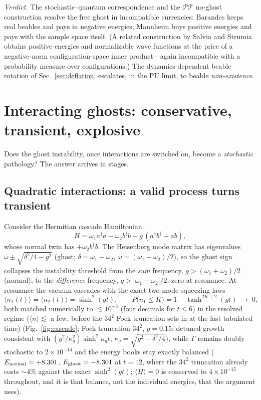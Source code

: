 \documentclass[11pt]{article}
\theoremstyle{definition}
\theoremstyle{remark}
\newcommand{\PT}{\mathcal{PT}}
\newcommand{\Gam}{\Gamma}
\newcommand{\avg}[1]{\langle #1 \rangle}
\begin{document}
\emph{Verdict.} The stochastic--quantum correspondence and the $\PT$
no-ghost construction resolve the free ghost in incompatible currencies:
Barandes keeps real beables and pays in negative energies; Mannheim buys
positive energies and pays with the sample space itself. (A related
construction by Salvio and Strumia \cite{SalvioStrumia2016} obtains
positive energies and normalizable wave functions at the price of a
negative-norm configuration-space inner product---again incompatible with
a probability measure over configurations.) The dynamics-dependent beable
rotation of Sec.~\ref{sec:deflation} escalates, in the PU limit, to beable
\emph{non-existence}.

\section{Interacting ghosts: conservative, transient, explosive}
\label{sec:interacting}

Does the ghost instability, once interactions are switched on, become a
\emph{stochastic} pathology? The answer arrives in stages.

\subsection{Quadratic interactions: a valid process turns transient}

Consider the Hermitian cascade Hamiltonian
\begin{equation}
H=\omega_1 a^{\dagger}a-\omega_2 b^{\dagger}b
+g\,(a^{\dagger}b^{\dagger}+ab),
\label{eq:cascade}
\end{equation}
whose normal twin has $+\omega_2 b^{\dagger}b$. The Heisenberg mode matrix
has eigenvalues
$\bar\omega\pm\sqrt{\delta^{2}/4-g^{2}}$ (ghost; $\delta=\omega_1-\omega_2$,
$\bar\omega=(\omega_1+\omega_2)/2$), so the ghost sign collapses the
instability threshold from the \emph{sum} frequency, $g>(\omega_1+\omega_2)/2$
(normal), to the \emph{difference} frequency, $g>|\omega_1-\omega_2|/2$:
zero at resonance. At resonance the vacuum cascades with the exact
two-mode-squeezing laws
\begin{equation}
\avg{n_1(t)}=\avg{n_2(t)}=\sinh^{2}(gt),
\qquad
P\bigl(n_1\le K\bigr)=1-\tanh^{2K+2}(gt)\;\longrightarrow\;0 ,
\label{eq:cascadelaws}
\end{equation}
both matched numerically to $\lesssim10^{-3}$ (four decimals for $t\le6$) in the resolved regime
($\langle n\rangle\lesssim$ a few, before the $34^2$ Fock truncation
sets in at the last tabulated time) (Fig.~\ref{fig:cascade};
Fock truncation $34^2$, $g=0.15$; detuned growth consistent with
$(g^{2}/\kappa_g^{2})\sinh^{2}\kappa_g t$, $\kappa_g=\sqrt{g^{2}-\delta^{2}/4}$),
while $\Gam$ remains doubly stochastic to $2\times10^{-14}$ and the energy
books stay exactly balanced ($E_{\rm normal}=+8.301$,
$E_{\rm ghost}=-8.301$ at $t=12$, where the $34^{2}$ truncation already
costs ${\sim}4\%$ against the exact $\sinh^{2}(gt)$; $\avg{H}=0$ is
conserved to $4\times10^{-15}$ throughout, and it is that balance, not
the individual energies, that the argument uses).
\end{document}
